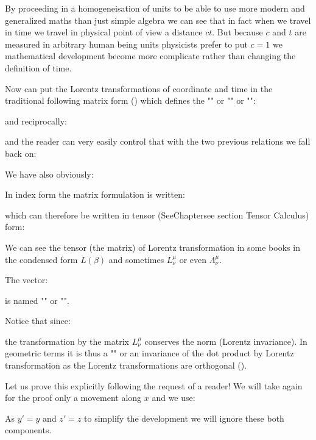 	By proceeding in a homogeneisation of units to be able to use more modern and generalized maths than just simple algebra we can see that in fact when we travel in time we travel in physical point of view a distance $ct$. But because $c$ and $t$ are measured in arbitrary human being units physicists prefer to put $c=1$ we mathematical development become more complicate rather than changing the definition of time.
	
	Now can put the Lorentz transformations of coordinate and time in the traditional following matrix form () which defines the "" or "" or "":
	
	and reciprocally:
	
	and the reader can very easily control that with the two previous relations we fall back on:
	
	We have also obviously:
	
	In index form the matrix formulation is written:
	
	which can therefore be written in tensor (SeeChapter{see section Tensor Calculus}) form:
	
	\begin{tcolorbox}[title=Remark,colframe=black,arc=10pt]
	We can see the tensor (the matrix) of Lorentz transformation in some books in the condensed form $L(\beta)$ and sometimes $L_\nu^\mu$ or even $\Lambda_\nu^\mu$.
	\end{tcolorbox}
	The vector:
	
	is named "" or "".
	
	Notice that since:
	
	the transformation by the matrix $L_\nu^\mu$ conserves the norm (Lorentz invariance). In geometric terms it is thus a "" or an invariance of the dot product by Lorentz transformation as the Lorentz transformations are orthogonal ().
	
	Let us prove this explicitly following the request of a reader! We will take again for the proof only a movement along $x$ and we use:
	
	As $y'=y$ and $z'=z$ to simplify the development we will ignore these both components.
	
